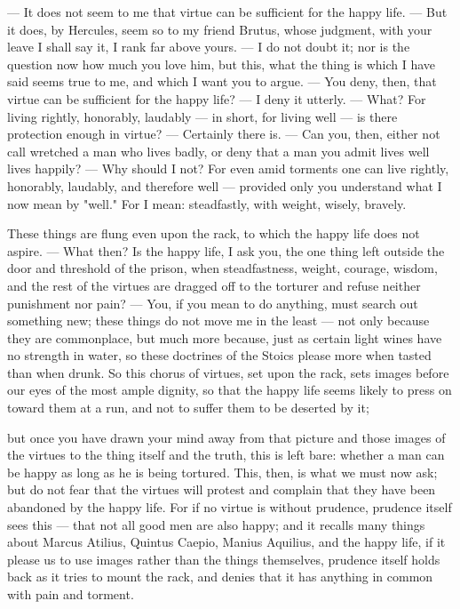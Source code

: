  — It does not seem to me that virtue can be sufficient for the happy life. — But it does, by Hercules, seem so to my friend Brutus, whose judgment, with your leave I shall say it, I rank far above yours. — I do not doubt it; nor is the question now how much you love him, but this, what the thing is which I have said seems true to me, and which I want you to argue. — You deny, then, that virtue can be sufficient for the happy life? — I deny it utterly. — What? For living rightly, honorably, laudably — in short, for living well — is there protection enough in virtue? — Certainly there is. — Can you, then, either not call wretched a man who lives badly, or deny that a man you admit lives well lives happily? — Why should I not? For even amid torments one can live rightly, honorably, laudably, and therefore well — provided only you understand what I now mean by "well." For I mean: steadfastly, with weight, wisely, bravely.

 These things are flung even upon the rack, to which the happy life does not aspire. — What then? Is the happy life, I ask you, the one thing left outside the door and threshold of the prison, when steadfastness, weight, courage, wisdom, and the rest of the virtues are dragged off to the torturer and refuse neither punishment nor pain? — You, if you mean to do anything, must search out something new; these things do not move me in the least — not only because they are commonplace, but much more because, just as certain light wines have no strength in water, so these doctrines of the Stoics please more when tasted than when drunk. So this chorus of virtues, set upon the rack, sets images before our eyes of the most ample dignity, so that the happy life seems likely to press on toward them at a run, and not to suffer them to be deserted by it;

 but once you have drawn your mind away from that picture and those images of the virtues to the thing itself and the truth, this is left bare: whether a man can be happy as long as he is being tortured. This, then, is what we must now ask; but do not fear that the virtues will protest and complain that they have been abandoned by the happy life. For if no virtue is without prudence, prudence itself sees this — that not all good men are also happy; and it recalls many things about Marcus Atilius, Quintus Caepio, Manius Aquilius, and the happy life, if it please us to use images rather than the things themselves, prudence itself holds back as it tries to mount the rack, and denies that it has anything in common with pain and torment.

